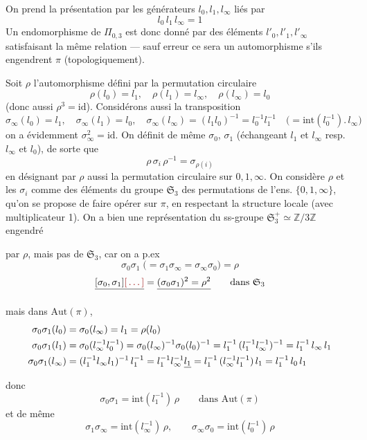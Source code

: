 \documentclass[11pt,a4paper]{article}
\begin{document}


On prend la présentation par les générateurs $l_0, l_1, l_\infty$ liés par
\[
l_0\, l_1\, l_\infty = 1
\]
Un endomorphisme de $\Pi_{0,3}$ est donc donné par des éléments
$l'_0, l'_1, l'_\infty$ satisfaisant la même relation — sauf erreur ce sera
un automorphisme s'ils engendrent $\pi$ (topologiquement).

Soit $\rho$ l'automorphisme défini par la permutation circulaire
\[
\rho(l_0) = l_1, \quad \rho(l_1) = l_\infty, \quad \rho(l_\infty) = l_0
\]
(donc aussi $\rho^3 = \mathrm{id}$). Considérons aussi la transposition
\[
\sigma_\infty(l_0) = l_1, \quad \sigma_\infty(l_1) = l_0, \quad
\sigma_\infty(l_\infty) = (l_1 l_0)^{-1} = l_0^{-1} l_1^{-1}
\quad \bigl(= \mathrm{int}(l_0^{-1}).\, l_\infty\bigr)
\]
on a évidemment $\sigma_\infty^2 = \mathrm{id}$. On définit de même
$\sigma_0$, $\sigma_1$ (échangeant $l_1$ et $l_\infty$ resp. $l_\infty$ et $l_0$),
de sorte que
\[
\rho\, \sigma_i\, \rho^{-1} = \sigma_{\rho(i)}
\]
en désignant par $\rho$ aussi la permutation circulaire sur $0, 1, \infty$. On
considère $\rho$ et les $\sigma_i$ comme des éléments du groupe
$\mathfrak{S}_3$ des permutations de l'ens. $\{0, 1, \infty\}$, qu'on se
propose de faire opérer sur $\pi$, en respectant la structure locale (avec
 multiplicateur 1). On a bien une
 représentation du ss-groupe
$\mathfrak{S}_3^{+} \simeq \mathbb{Z}/3\mathbb{Z}$ engendré



par $\rho$, mais pas de $\mathfrak{S}_3$, car on a p.ex
\[
\sigma_0\sigma_1 \;\bigl(= \sigma_1\sigma_\infty = \sigma_\infty\sigma_0\bigr) = \rho
\]
\[
\struck{[\sigma_0, \sigma_1] \ill{}} = \struck{(\sigma_0\sigma_1)^2 = \rho^2}
\qquad \text{dans } \mathfrak{S}_3
\]


mais dans $\mathrm{Aut}(\pi)$, 
\[
\begin{aligned}
\sigma_0\sigma_1(l_0) &= \sigma_0(l_\infty) = l_1 = \rho(l_0) \\
\sigma_0\sigma_1(l_1) &= \sigma_0(l_\infty^{-1} l_0^{-1}) = \sigma_0(l_\infty)^{-1}\sigma_0(l_0)^{-1}
= l_1^{-1}\,(l_1^{-1} l_\infty^{-1})^{-1} = l_1^{-1}\, l_\infty\, l_1 \\
\sigma_0\sigma_1(l_\infty) &= (l_1^{-1} l_\infty l_1)^{-1}\, l_1^{-1}
= l_1^{-1} l_\infty^{-1} \struck{l_1} = l_1^{-1}\,(l_\infty^{-1} l_1^{-1})\, l_1 = l_1^{-1}\, l_0\, l_1
\end{aligned}
\]
donc
\[
\sigma_0\sigma_1 = \mathrm{int}(l_1^{-1})\,\rho \qquad \text{dans } \mathrm{Aut}(\pi)
\]
et de même
\[
\sigma_1\sigma_\infty = \mathrm{int}(l_\infty^{-1})\,\rho, \qquad
\sigma_\infty\sigma_0 = \mathrm{int}(l_0^{-1})\,\rho
\]
\end{document}
